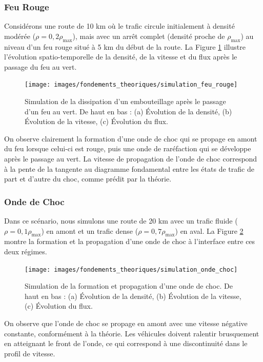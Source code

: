 \subsubsection{Feu Rouge}
\label{subsubsec:feu_rouge}

Considérons une route de 10 km où le trafic circule initialement à densité modérée ($\rho = 0,2\rho_{\max}$), mais avec un arrêt complet (densité proche de $\rho_{\max}$) au niveau d'un feu rouge situé à 5 km du début de la route. La Figure \ref{fig:feu_rouge} illustre l'évolution spatio-temporelle de la densité, de la vitesse et du flux après le passage du feu au vert.

\begin{figure}[htbp]
\centering
\texttt{[image: images/fondements\_theoriques/simulation\_feu\_rouge]}
\caption{Simulation de la dissipation d'un embouteillage après le passage d'un feu au vert. De haut en bas : (a) Évolution de la densité, (b) Évolution de la vitesse, (c) Évolution du flux.}
\label{fig:feu_rouge}
\end{figure}

On observe clairement la formation d'une onde de choc qui se propage en amont du feu lorsque celui-ci est rouge, puis une onde de raréfaction qui se développe après le passage au vert. La vitesse de propagation de l'onde de choc correspond à la pente de la tangente au diagramme fondamental entre les états de trafic de part et d'autre du choc, comme prédit par la théorie.

\subsubsection{Onde de Choc}
\label{subsubsec:onde_choc_sim}

Dans ce scénario, nous simulons une route de 20 km avec un trafic fluide ($\rho = 0,1\rho_{\max}$) en amont et un trafic dense ($\rho = 0,7\rho_{\max}$) en aval. La Figure \ref{fig:sim_onde_choc} montre la formation et la propagation d'une onde de choc à l'interface entre ces deux régimes.

\begin{figure}[htbp]
\centering
\texttt{[image: images/fondements\_theoriques/simulation\_onde\_choc]}
\caption{Simulation de la formation et propagation d'une onde de choc. De haut en bas : (a) Évolution de la densité, (b) Évolution de la vitesse, (c) Évolution du flux.}
\label{fig:sim_onde_choc}
\end{figure}

On observe que l'onde de choc se propage en amont avec une vitesse négative constante, conformément à la théorie. Les véhicules doivent ralentir brusquement en atteignant le front de l'onde, ce qui correspond à une discontinuité dans le profil de vitesse.

